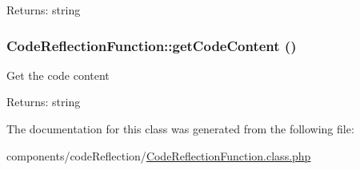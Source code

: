 \begin{Desc}
\item[Returns:]string \end{Desc}
\hypertarget{class_code_reflection_function_11b5048c516be3731737308e5cddef79}{
\subsubsection[{getCodeContent}]{\setlength{\rightskip}{0pt plus 5cm}CodeReflectionFunction::getCodeContent ()}}
\label{class_code_reflection_function_11b5048c516be3731737308e5cddef79}


Get the code content

\begin{Desc}
\item[Returns:]string \end{Desc}


The documentation for this class was generated from the following file:\begin{CompactItemize}
\item 
components/codeReflection/\hyperlink{_code_reflection_function_8class_8php}{CodeReflectionFunction.class.php}\end{CompactItemize}
